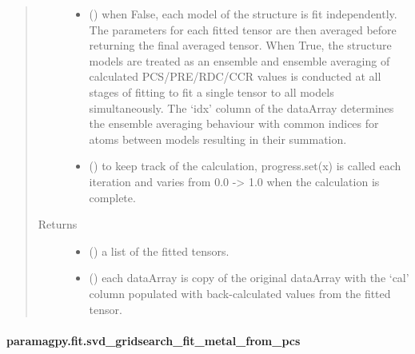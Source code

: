 \documentclass[a4paper,10pt,english,openany,oneside]{sphinxmanual}
\begin{document}
\begin{fulllineitems}
\begin{quote}
\begin{description}
\begin{itemize}
\item {} 
 (\sphinxstyleliteralemphasis{\sphinxupquote{, }}) \textendash{} when False, each model of the structure is fit independently.
The parameters for each fitted tensor are then averaged before
returning the final averaged tensor.
When True, the structure models are treated as an ensemble and
ensemble averaging of calculated PCS/PRE/RDC/CCR values is
conducted at all stages of fitting to fit a single tensor to all
models simultaneously. The ‘idx’ column of the dataArray
determines the ensemble averaging behaviour with common indices
for atoms between models resulting in their summation.

\item {} 
 (\sphinxstyleliteralemphasis{\sphinxupquote{, }}) \textendash{} to keep track of the calculation, progress.set(x) is called each
iteration and varies from 0.0 -\textgreater{} 1.0 when the calculation is complete.

\end{itemize}

\item[{Returns}] \leavevmode
\begin{itemize}
\item {} 
 () \textendash{} a list of the fitted tensors.

\item {} 
 () \textendash{} each dataArray is copy of the original dataArray with
the ‘cal’ column populated with back-calculated values from the
fitted tensor.

\end{itemize}


\end{description}\end{quote}

\end{fulllineitems}



\paragraph{paramagpy.fit.svd\_gridsearch\_fit\_metal\_from\_pcs}
\label{\detokenize{reference/generated/paramagpy.fit.svd_gridsearch_fit_metal_from_pcs:paramagpy-fit-svd-gridsearch-fit-metal-from-pcs}}\label{\detokenize{reference/generated/paramagpy.fit.svd_gridsearch_fit_metal_from_pcs::doc}}
\end{document}

